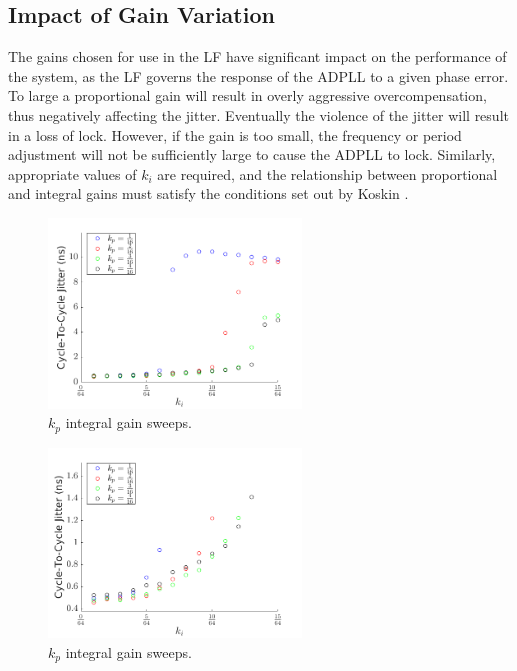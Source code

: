 \subsection{Impact of Gain Variation}
The gains chosen for use in the \acl{LF} have significant impact on the performance of the system, as the \ac{LF} governs the response of the \ac{ADPLL} to a given phase error. To large a proportional gain will result in overly aggressive overcompensation, thus negatively affecting the jitter. Eventually the violence of the jitter will result in a loss of lock. However, if the gain is too small, the frequency or period adjustment will not be sufficiently large to cause the \ac{ADPLL} to lock. Similarly, appropriate values of $k_i$ are required, and the relationship between proportional and integral gains must satisfy the conditions set out by Koskin \cite{koskin2018generation}.

\begin{figure}[h]
    \centering
    \includegraphics[width=0.6\textwidth]{../fixed_kp.png}
    \caption[Fixed $k_p$ integral gain sweeps]{\Fixed $k_p$ integral gain sweeps.}
    \label{fig:gain_sweep}
\end{figure}
\begin{figure}[h]
    \centering
    \includegraphics[width=0.6\textwidth]{../fixed_kp_zoom.png} 
    \caption[Fixed $k_p$ integral gain sweeps]{\Fixed $k_p$ integral gain sweeps.}
    \label{fig:gain_sweep_zoom}
\end{figure}

